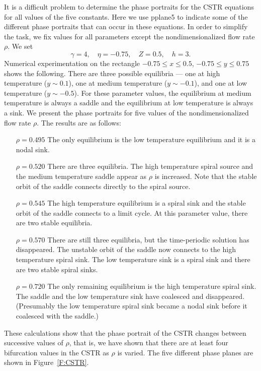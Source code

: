 \documentclass{ximera}
\begin{document}
It is a difficult problem to determine the phase portraits for
the CSTR equations for all values of the five constants. Here we
use {\sf pplane5} to indicate some of the different phase
portraits that can occur in these equations.  In order to
simplify the task, we fix values for all parameters except
the nondimensionalized flow rate $\rho$.  We set
\begin{equation}   \label{e:CSTRparam}
\gamma=4, \quad \eta=-0.75, \quad Z=0.5, \quad h =3.
\end{equation}
Numerical experimentation on the rectangle $-0.75\leq x
\leq 0.5$, $-0.75\leq y\leq 0.75$ shows the following.  There are 
three possible equilibria --- one at high temperature ($y\sim 0.1$), 
one at medium temperature ($y\sim -0.1$), and one at low
temperature ($y\sim -0.5$).  For these parameter values, the 
equilibrium at medium temperature is always a saddle and the 
equilibrium at low temperature is always a 
sink.  We present the 
phase portraits for five values of the nondimensionalized 
flow rate
$\rho$.  The results are as follows:  
\begin{itemize}
\item[$\rho=0.495$] The only equilibrium is the low temperature 
equilibrium and it is a nodal sink. 
\item[$\rho=0.520$] There are three equilibria. The high 
temperature spiral source and the medium temperature saddle appear
as $\rho$ is increased.  Note that the stable orbit of the 
saddle connects directly to the spiral source.
\item[$\rho=0.545$] The high temperature equilibrium is a spiral 
sink and the stable orbit of the saddle connects to a limit 
cycle.  At this parameter value, there are two stable equilibria.
 
\item[$\rho=0.570$] There are still three equilibria, but the 
time-periodic solution has disappeared.  The unstable orbit of 
the saddle now connects to the high temperature spiral sink. The
low temperature sink is a spiral sink and there are two stable
spiral sinks. 
\item[$\rho=0.720$] The only remaining equilibrium is the high
temperature spiral sink.  The saddle and the low temperature 
sink have coalesced and disappeared.  (Presumably the low temperature 
spiral sink became a nodal sink before it coalesced with the saddle.)
\end{itemize}

These calculations show that the phase portrait of the CSTR changes 
between successive values of $\rho$, that is, we have shown that 
there are at least four bifurcation values in the CSTR as $\rho$ 
is varied.  The five different phase planes are shown in Figure~\ref{F:CSTR}.
\end{document}
